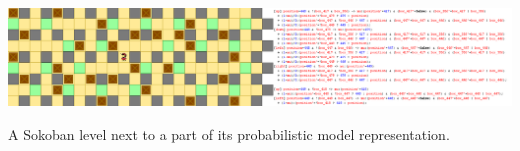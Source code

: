 \documentclass[acmtog, authorversion]{acmart}
\begin{document}



\begin{teaserfigure}
  \includegraphics[width=\textwidth]{teaser}
  \caption{A Sokoban level next to a part of its probabilistic model representation.}
  \label{fig:teaser}
\end{teaserfigure}


\maketitle























\end{document}
